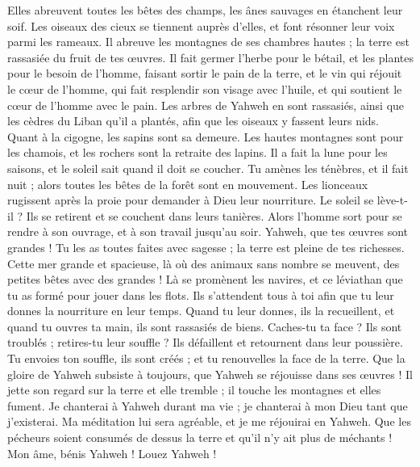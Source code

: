 \begin{multicols}{2}
Elles abreuvent toutes les bêtes des champs, les ânes sauvages en étanchent leur soif.
Les oiseaux des cieux se tiennent auprès d'elles, et font résonner leur voix parmi les rameaux.
Il abreuve les montagnes de ses chambres hautes ; la terre est rassasiée du fruit de tes œuvres.
Il fait germer l’herbe pour le bétail, et les plantes pour le besoin de l'homme, faisant sortir le pain de la terre,
et le vin qui réjouit le cœur de l'homme, qui fait resplendir son visage avec l'huile, et qui soutient le cœur de l'homme avec le pain.
Les arbres de Yahweh en sont rassasiés, ainsi que les cèdres du Liban qu'il a plantés,
afin que les oiseaux y fassent leurs nids. Quant à la cigogne, les sapins sont sa demeure.
Les hautes montagnes sont pour les chamois, et les rochers sont la retraite des lapins.
Il a fait la lune pour les saisons, et le soleil sait quand il doit se coucher.
Tu amènes les ténèbres, et il fait nuit ; alors toutes les bêtes de la forêt sont en mouvement.
Les lionceaux rugissent après la proie pour demander à Dieu leur nourriture.
Le soleil se lève-t-il ? Ils se retirent et se couchent dans leurs tanières.
Alors l'homme sort pour se rendre à son ouvrage, et à son travail jusqu’au soir.
Yahweh, que tes œuvres sont grandes ! Tu les as toutes faites avec sagesse ; la terre est pleine de tes richesses.
Cette mer grande et spacieuse, là où des animaux sans nombre se meuvent, des petites bêtes avec des grandes !
Là se promènent les navires, et ce léviathan que tu as formé pour jouer dans les flots.
Ils s'attendent tous à toi afin que tu leur donnes la nourriture en leur temps.
Quand tu leur donnes, ils la recueillent, et quand tu ouvres ta main, ils sont rassasiés de biens.
Caches-tu ta face ? Ils sont troublés ; retires-tu leur souffle ? Ils défaillent et retournent dans leur poussière.
Tu envoies ton souffle, ils sont créés ; et tu renouvelles la face de la terre.
Que la gloire de Yahweh subsiste à toujours, que Yahweh se réjouisse dans ses œuvres !
Il jette son regard sur la terre et elle tremble ; il touche les montagnes et elles fument.
Je chanterai à Yahweh durant ma vie ; je chanterai à mon Dieu tant que j'existerai.
Ma méditation lui sera agréable, et je me réjouirai en Yahweh.
Que les pécheurs soient consumés de dessus la terre et qu'il n'y ait plus de méchants ! Mon âme, bénis Yahweh ! Louez Yahweh !

\end{multicols}
